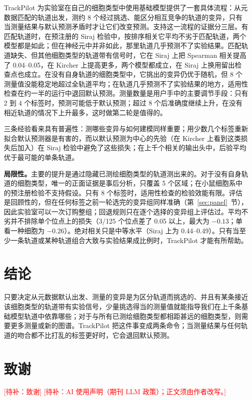 \documentclass[webpdf,contemporary,large]{oup-authoring-template}
\newcommand{\todo}[1]{\textcolor{red}{[待补：#1]}}
\newcommand{\tp}{TrackPilot}
\begin{document}
\tp{} 为实验室在自己的细胞类型中使用基础模型提供了一套具体流程：从元数据匹配的轨道出发，测约 8 个经过挑选、能区分相互竞争的轨道的变异，只有当测量结果与默认预测矛盾时才让它们改变预测。支持这一流程的证据分三层。有匹配轨道时，在预注册的 Siraj 检验中，按排序相关它平均不劣于匹配轨道，两个模型都是如此；但在神经元中并非如此，那里轨道几乎预测不了实验结果。匹配轨道缺失、但其他细胞类型的轨道带有信号时，它在 Siraj 上把 Spearman 相关提高了 0.04--0.05，在 Kircher 上提高更多，两个模型都成立，在 Siraj 上换用留出检查点也成立。在没有自身轨道的细胞类型中，它挑出的变异仍优于随机，但 8 个测量值没能稳定地超过全轨道平均；在轨道几乎预测不了实验结果的地方，适用性检查在约一半的运行中退回默认预测。测量数量是用户手中的主要调节手段：只有 2 到 4 个标签时，预测可能低于默认预测；超过 8 个后准确度继续上升，在没有相近轨道的情况下上升最多，这时做第二轮是值得的。

三条经验看来具有普遍性：测哪些变异与如何建模同样重要；用少数几个标签重新拟合默认预测器是有害的，而以默认预测为中心的先验（在 Kircher 上看到这类损失后加入）在 Siraj 检验中避免了这些损失；在上千个相关的输出头中，后验平均优于最可能的单条轨道。

\textbf{局限性。}主要的提升是通过隐藏已测绘细胞类型的轨道测出来的。对于没有自身轨道的细胞类型，唯一的正面证据是事后分析，只覆盖 5 个区域；在小鼠细胞系中的预注册检验不支持假设。只有 8 个标签时，适用性检查的检验效能有限。评估是回顾性的，但在任何标签之前一轮选完的变异组同样准确（第~\ref{sec:panel}~节），因此实验室可以一次订购整组；回退规则只在逐个选择的变异组上评估过。平均不劣并不排除单个位点上的损失（3/125 个位点差了 0.05 以上，最大为 $-0.13$；单看一种细胞为 $-0.26$）。绝对相关只是中等水平（Siraj 上为 0.44--0.49）。只有当至少一条轨道或某种轨道组合大致与实验结果成比例时，\tp{} 才能有所帮助。

\section{结论}

只要决定从元数据默认出发、测量的变异是为区分轨道而挑选的、并且有某条接近该细胞类型的轨道带有实验信号，少量挑选得当的测量值就能指导我们在上千条基础模型轨道中依靠哪些；对于与所有已测绘细胞类型都相距甚远的细胞类型，则需要更多测量或新的图谱。\tp{} 把这件事变成两条命令；当测量结果与任何轨道的吻合都不比打乱的标签更好时，它会退回默认预测。

\section*{致谢}
\todo{致谢}
\todo{AI 使用声明（期刊 LLM 政策）；正文须由作者改写。}
\end{document}
